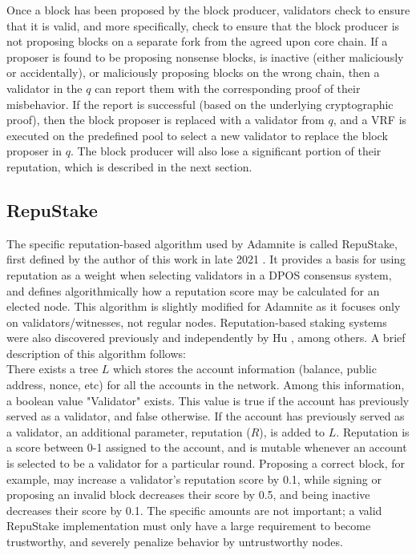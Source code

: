 \documentclass[conference]{IEEEtran}
\begin{document}
Once a block has been proposed by the block producer, validators check to ensure that it is valid, and more specifically, check to ensure that the block producer is not proposing blocks on a separate fork from the agreed upon core chain. If a proposer is found to be proposing nonsense blocks, is inactive (either maliciously or accidentally), or maliciously proposing blocks on the wrong chain, then a validator in the $q$ can report them with the corresponding proof of their misbehavior. If the report is successful (based on the underlying cryptographic proof), then the block proposer is replaced with a validator from $q$, and a VRF is executed on the predefined pool to select a new validator to replace the block proposer in $q$. The block producer will also lose a significant portion of their reputation, which is described in the next section.
\subsection{RepuStake}
The specific reputation-based algorithm used by Adamnite is called RepuStake, first defined by the author of this work in late 2021 \cite{Chaudhury2021Reputsake}. It provides a basis for using reputation as a weight when selecting validators in a DPOS consensus system, and defines algorithmically how a reputation score may be calculated for an elected node. This algorithm is slightly modified for Adamnite as it focuses only on validators/witnesses, not regular nodes. Reputation-based staking systems were also discovered previously and independently by Hu \cite{Hu2020ImprovedDPOS}, among others. A brief description of this algorithm follows:\\
There exists a tree $L$ which stores the account information (balance, public address, nonce, etc) for all the accounts in the network. Among this information, a boolean value "Validator" exists. This value is true if the account has previously served as a validator, and false otherwise. If the account has previously served as a validator, an additional parameter, reputation ($R$), is added to $L$. Reputation is a score between 0-1 assigned to the account, and is mutable whenever an account is selected to be a validator for a particular round. Proposing a correct block, for example, may increase a validator's reputation score by 0.1, while signing or proposing an invalid block decreases their score by 0.5, and being inactive decreases their score by 0.1. The specific amounts are not important; a valid RepuStake implementation must only have a large requirement to become trustworthy, and severely penalize behavior by untrustworthy nodes.\\
\end{document}
